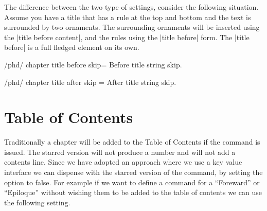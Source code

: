 \begin{decription}
{The difference between the two type of settings, consider the following situation. Assume you have a title that has a rule at the top and bottom and the text is surrounded by two ornaments. The surrounding ornaments will be inserted using the |title before content|, and the rules using the |title before| form. The |title before| is a full fledged element on its own. 

%
%



 
\begin{docKey}{/phd/ chapter title before skip}{= }{}
Before title string skip.
\end{docKey}

\begin{docKey}{/phd/ chapter title after skip}{ =  }{}
After title string skip.
\end{docKey}

\lorem 
%
%
%         
%
%



\section{Table of Contents}

Traditionally a chapter will be added to the Table of Contents if the  command is issued. The starred version will not produce a number and will not add a contents line. Since we have adopted an approach where we use a key value interface we can dispense with the starred version of the command, by setting the  option to false. For example if we want to define a command for a ``Foreward'' or ``Epiloque'' without wishing them to be added to the table of contents we can use the following setting.



}
\end{decription}
